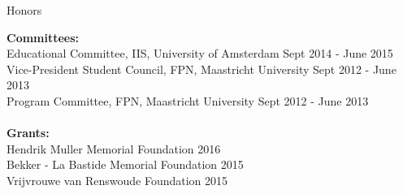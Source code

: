 \documentclass{resume}
\begin{document}
\begin{sections}{Honors}

{\bf Committees:}
\\
{Educational Committee, IIS, University of Amsterdam} \hfill {Sept 2014 - June 2015} 
\\
{Vice-President Student Council, FPN, Maastricht University} \hfill {Sept 2012 - June 2013} 
\\
{Program Committee, FPN, Maastricht University} \hfill {Sept 2012 - June 2013}
\\
\\
{\bf Grants:}
\\
{Hendrik Muller Memorial Foundation} \hfill {2016}
\\
{Bekker - La Bastide Memorial Foundation} \hfill {2015}
\\
{Vrijvrouwe van Renswoude Foundation} \hfill {2015}

\end{sections}
\end{document}
